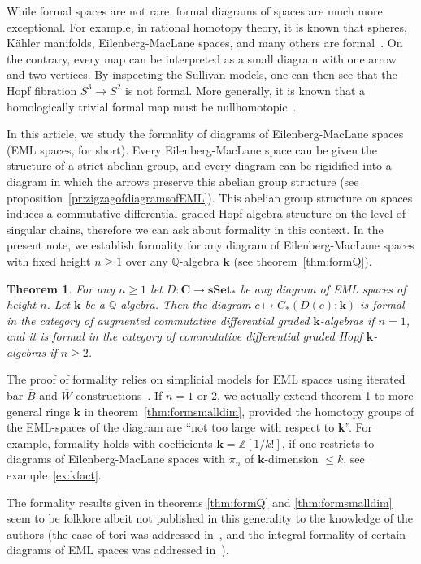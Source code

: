 \documentclass{amsart}
\newcounter{thmMaincounter}
\newtheorem{theoremM}[thmMaincounter]{Theorem}
\theoremstyle{definition}
\theoremstyle{remark}
\newcommand{\Z}{\mathbb Z}
\newcommand{\Q}{\mathbb Q}
\renewcommand{\leq}{\leqslant}
\renewcommand{\geq}{\geqslant}
\renewcommand{\ge}{\geqslant}
\newcommand{\Cc}{\mathbf{C}}
\newcommand{\sset}{\mathbf{sSet}}
\def\k{\mathbf{k}}
\begin{document}
While formal spaces are not rare, formal diagrams of spaces are much more exceptional. For example, in rational homotopy theory, it is known that spheres, K\"ahler manifolds, Eilenberg-MacLane spaces, and many others are formal~\cite{FHT}. On the contrary, every map can be interpreted as a small diagram with one arrow and two vertices. By inspecting the Sullivan models, one can then see that the Hopf fibration $S^3\to S^2$ is not formal. More generally, it is known that a homologically trivial formal map must be nullhomotopic~\cite[Lemme~3.9]{le-si-81}.

In this article, we study the formality of diagrams of Eilenberg-MacLane spaces (EML spaces, for short). Every Eilenberg-MacLane space can be given the structure of a strict abelian group, and every diagram can be rigidified into a diagram in which the arrows preserve this abelian group structure (see proposition~\ref{pr:zigzagofdiagramsofEML}). This abelian group structure on spaces induces a commutative differential graded Hopf algebra structure on the level of singular chains, therefore we can ask about formality in this context. 
In the present note, we establish formality for any diagram of Eilenberg-MacLane spaces with fixed height $n\geq 1$ over any $\Q$-algebra $\k$ (see theorem~\ref{thm:formQ}).
\begin{theoremM}\label{thmm:formQ}
	For any $n\ge 1$ let $D\colon\Cc\to \sset_{*}$ be any diagram of EML spaces of height $n$.
	Let $\k$ be a $\Q$-algebra.
	Then the diagram $c\mapsto C_{*}(D(c);\k)$ is formal in the category of augmented commutative differential graded $\k$-algebras if $n=1$, and it is formal in the category of commutative differential graded Hopf $\k$-algebras if $n\ge 2$.     
\end{theoremM}
The proof of formality relies on simplicial models for EML spaces using iterated bar $\overline{B}$ and $\overline{W}$ constructions~\cite{gu-ma-74}. If $n=1$ or $2$, we actually extend theorem \ref{thmm:formQ} to more general rings $\k$ in theorem~\ref{thm:formsmalldim}, provided the homotopy groups of the EML-spaces of the diagram are ``not too large with respect to $\k$''. For example, formality holds with coefficients $\k=\Z[1/k!]$, if one restricts to diagrams of Eilenberg-MacLane spaces with $\pi_{n}$ of $\k$-dimension $\leq k$, see example~\ref{ex:kfact}.

The formality results given in theorems \ref{thm:formQ} and \ref{thm:formsmalldim} seem to be folklore albeit not published in this generality to the knowledge of the authors (the case of tori was addressed in~\cite{fr-21}, and the integral formality of certain diagrams of EML spaces was addressed in~\cite{no-ra-05}).
\end{document}

